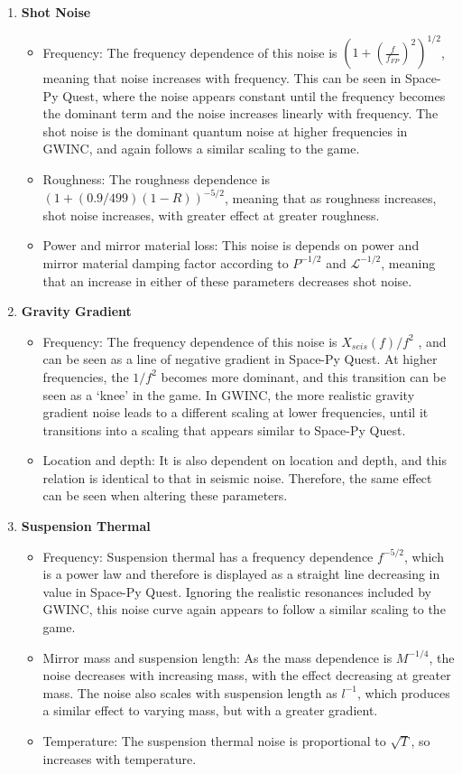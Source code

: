 \documentclass{article}
\begin{document}
\begin{enumerate}
    \item \textbf{Shot Noise}
    \begin{itemize}
    \item Frequency: The frequency dependence of this noise is $(1+\left(\frac{f}{f_{FP}}\right)^2)^{1/2}$, meaning that noise increases with frequency. This can be seen in Space-Py Quest, where the noise appears constant until the frequency becomes the dominant term and the noise increases linearly with frequency. The shot noise is the dominant quantum noise at higher frequencies in GWINC, and again follows a similar scaling to the game. 
    \item Roughness: The roughness dependence is $(1+(0.9/499)(1-R))^{-5/2}$, meaning that as roughness increases, shot noise increases, with greater effect at greater roughness. 
    \item Power and mirror material loss: This noise is depends on power and mirror material damping factor according to $P^{-1/2}$ and $\mathcal{L}^{-1/2}$, meaning that an increase in either of these parameters decreases shot noise.
    \end{itemize}
    
    \item \textbf{Gravity Gradient}
    \begin{itemize}
    \item Frequency: The frequency dependence of this noise is $X_{seis}(f)/f^2$ , and can be seen as a line of negative gradient in Space-Py Quest. At higher frequencies, the $1/f^2$ becomes more dominant, and this transition can be seen as a `knee' in the game. In GWINC, the more realistic gravity gradient noise leads to a different scaling at lower frequencies, until it transitions into a scaling that appears similar to Space-Py Quest. 
    \item Location and depth: It is also dependent on location and depth, and this relation is identical to that in seismic noise. Therefore, the same effect can be seen when altering these parameters. 
    \end{itemize}
    
    \item \textbf{Suspension Thermal}
    \begin{itemize}
   \item Frequency: Suspension thermal has a frequency dependence $f^{-5/2}$, which is a power law and therefore is displayed as a straight line decreasing in value in Space-Py Quest. Ignoring the realistic resonances included by GWINC, this noise curve again appears to follow a similar scaling to the game. 
   \item Mirror mass and suspension length: As the mass dependence is $M^{-1/4}$, the noise decreases with increasing mass, with the effect decreasing at greater mass. The noise also scales with suspension length as $l^{-1}$, which produces a similar effect to varying mass, but with a greater gradient. 
   \item Temperature: The suspension thermal noise is proportional to $\sqrt{T}$, so increases with temperature. 
 \end{itemize}
\end{enumerate}
\end{document}

